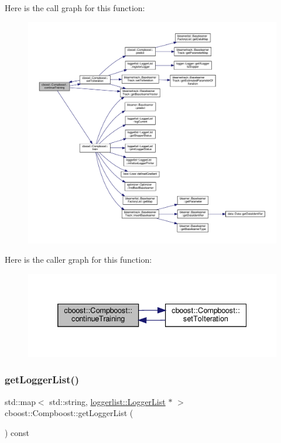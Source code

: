 Here is the call graph for this function\+:\nopagebreak
\begin{figure}[H]
\begin{center}
\leavevmode
\includegraphics[width=350pt]{classcboost_1_1_compboost_a191aa22dbfcc3d2e878ef75c0b196d07_cgraph}
\end{center}
\end{figure}
Here is the caller graph for this function\+:\nopagebreak
\begin{figure}[H]
\begin{center}
\leavevmode
\includegraphics[width=332pt]{classcboost_1_1_compboost_a191aa22dbfcc3d2e878ef75c0b196d07_icgraph}
\end{center}
\end{figure}
\mbox{\label{classcboost_1_1_compboost_a0376256bdfde1a50b420ad7412f4b4dd}} 
\subsubsection{\texorpdfstring{get\+Logger\+List()}{getLoggerList()}}
{\footnotesize\ttfamily std\+::map$<$ std\+::string, \hyperlink{classloggerlist_1_1_logger_list}{loggerlist\+::\+Logger\+List} $\ast$ $>$ cboost\+::\+Compboost\+::get\+Logger\+List (\begin{DoxyParamCaption}{ }\end{DoxyParamCaption}) const}

